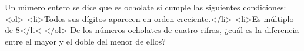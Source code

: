 Un número entero se dice que es ocholate si cumple las siguientes condiciones: 
<ol>
<li>Todos sus dígitos aparecen en orden creciente.</li>
<li>Es múltiplo de 8</li<
</ol>
De los números ocholates de cuatro cifras, ¿cuál es la diferencia entre el mayor y el doble del menor de ellos?
